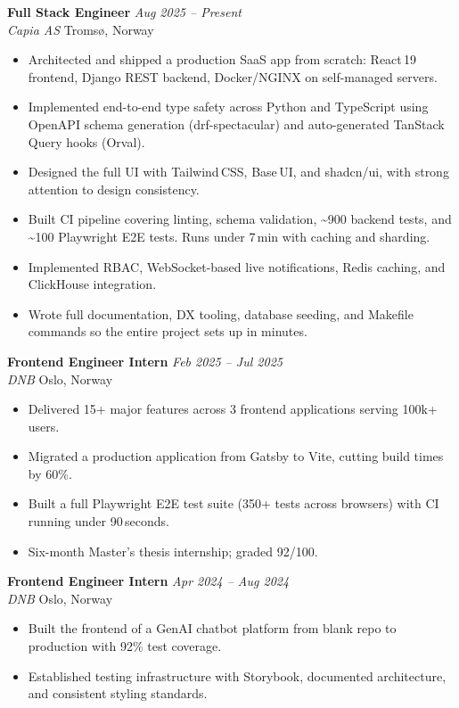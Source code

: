 \documentclass[a4paper,10pt]{article}
\newcommand{\entry}[4]{%
    \noindent\textbf{#1} \hfill \textit{#2} \\
    \textit{#3} \hfill #4
    \vspace{1pt}
}
\begin{document}
\entry{Full Stack Engineer}{Aug 2025 -- Present}{Capia AS}{Tromsø, Norway}
\begin{itemize}
    \item Architected and shipped a production SaaS app from scratch: React\,19 frontend, Django REST backend, Docker/NGINX on self-managed servers.
    \item Implemented end-to-end type safety across Python and TypeScript using OpenAPI schema generation (drf-spectacular) and auto-generated TanStack Query hooks (Orval).
    \item Designed the full UI with Tailwind\,CSS, Base\,UI, and shadcn/ui, with strong attention to design consistency.
    \item Built CI pipeline covering linting, schema validation, \textasciitilde900 backend tests, and \textasciitilde100 Playwright E2E tests. Runs under 7\,min with caching and sharding.
    \item Implemented RBAC, WebSocket-based live notifications, Redis caching, and ClickHouse integration.
    \item Wrote full documentation, DX tooling, database seeding, and Makefile commands so the entire project sets up in minutes.
\end{itemize}

\vspace{2pt}

\entry{Frontend Engineer Intern}{Feb 2025 -- Jul 2025}{DNB}{Oslo, Norway}
\begin{itemize}
    \item Delivered 15+ major features across 3 frontend applications serving 100k+ users.
    \item Migrated a production application from Gatsby to Vite, cutting build times by 60\%.
    \item Built a full Playwright E2E test suite (350+ tests across browsers) with CI running under 90\,seconds.
    \item Six-month Master's thesis internship; graded 92/100.
\end{itemize}

\vspace{2pt}

\entry{Frontend Engineer Intern}{Apr 2024 -- Aug 2024}{DNB}{Oslo, Norway}
\begin{itemize}
    \item Built the frontend of a GenAI chatbot platform from blank repo to production with 92\% test coverage.
    \item Established testing infrastructure with Storybook, documented architecture, and consistent styling standards.
\end{itemize}
\end{document}
